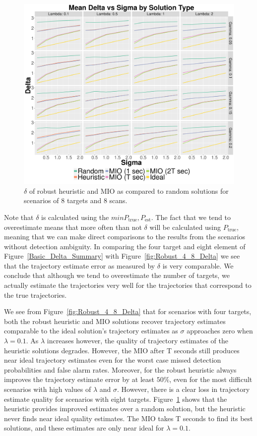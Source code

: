 \begin{figure}[ht]
  \centering
  \includegraphics[width=\columnwidth]{../Figures/8_8_Delta}
  \caption{$\delta$ of robust heuristic and MIO as compared to random solutions for scenarios of 8 targets and 8 scans.}
  \label{fig:Robust_8_8_Delta}
\end{figure}

Note that $\delta$ is calculated using the $min{P_{\text{true}},P_{\text{est}}}$. The fact that we tend to overestimate means that more often than not $\delta$ will be calculated using $P_{\text{true}}$, meaning that we can make direct comparisons to the results from the scenarios without detection ambiguity. In comparing the four target and eight element of Figure~\ref{Basic_Delta_Summary} with Figure~\ref{fig:Robust_4_8_Delta} we see that the trajectory estimate error as measured by $\delta$ is very comparable. We conclude that although we tend to overestimate the number of targets, we actually estimate the trajectories very well for the trajectories that correspond to the true trajectories. 

We see from Figure~\ref{fig:Robust_4_8_Delta} that for scenarios with four targets, both the robust heuristic and MIO solutions recover trajectory estimates comparable to the ideal solution's trajectory estimates as $\sigma$ approaches zero when $\lambda =0.1$. As $\lambda$ increases however, the quality of trajectory estimates of the heuristic solutions degrades. However, the MIO after T seconds still produces near ideal trajectory estimates even for the worst case missed detection probabilities and false alarm rates. Moreover, for the robust heuristic always improves the trajectory estimate error by at least $50\%$, even for the most difficult scenarios with high values of $\lambda$ and $\sigma$. However, there is a clear loss in trajectory estimate quality for scenarios with eight targets. Figure~\ref{fig:Robust_8_8_Delta} shows that the heuristic provides improved estimates over a random solution, but the heuristic never finds near ideal quality estimates. The MIO takes T seconds to find its best solutions, and these estimates are only near ideal for $\lambda=0.1$. 

